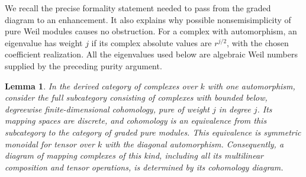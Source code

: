 \documentclass[11pt]{article}
\numberwithin{equation}{section}
\newtheorem{lemma}[theorem]{Lemma}
\theoremstyle{definition}
\theoremstyle{remark}
\begin{document}
We recall the precise formality statement needed to pass from the
graded diagram to an enhancement.  It also explains why possible
nonsemisimplicity of pure Weil modules causes no obstruction.
For a complex with automorphism, an eigenvalue has weight $j$ if
its complex absolute values are $r^{j/2}$, with the chosen
coefficient realization.  All the eigenvalues used below are
algebraic Weil numbers supplied by the preceding purity argument.

\begin{lemma}\label{enh:pure-formality}
In the derived category of complexes over $k$ with one automorphism,
consider the full subcategory consisting of complexes with bounded
below, degreewise finite-dimensional cohomology, pure of weight $j$
in degree $j$.  Its mapping spaces are discrete, and cohomology is
an equivalence from this subcategory to the category of graded
pure modules.  This equivalence is symmetric monoidal for tensor
over $k$ with the diagonal automorphism.
Consequently, a diagram of mapping complexes of this kind, including
all its multilinear composition and tensor operations, is determined
by its cohomology diagram.
\end{lemma}
\end{document}
